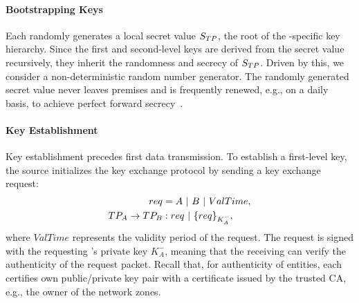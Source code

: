 \paragraph{Bootstrapping Keys}
Each \tp randomly generates a local secret value $S_{TP}$, the root of the \tp-specific 
key hierarchy. Since the first and second-level keys are derived from the secret value 
recursively, they inherit the randomness and secrecy of $S_{TP}$. Driven by this, we 
consider a non-deterministic random number generator. The randomly generated secret value 
never leaves \tp premises and is frequently renewed, e.g., on a daily basis, to achieve 
perfect forward secrecy~\cite{rfc1363}.




\paragraph{Key Establishment}
Key establishment precedes first data transmission. To establish a first-level key, 
the source \tp initializes the key exchange protocol by sending a key exchange request:
\noindent 
\begin{subequations}
\begin{align}
req & = A~|~B~|~ValTime, \\
TP_A \rightarrow TP_B & : req~|~\{req\}_{K^-_A},
\end{align}
\label{eq:req}
\end{subequations}
\noindent 
where $ValTime$ represents the validity period of the request. The request is signed with
the requesting \tp's private key ${K^-_A}$, meaning that the receiving \tp can verify the
authenticity of the request packet. Recall that, for authenticity of \name entities, each
\tp certifies own public/private key pair with a certificate issued by the trusted CA,
e.g., the owner of the network zones.

